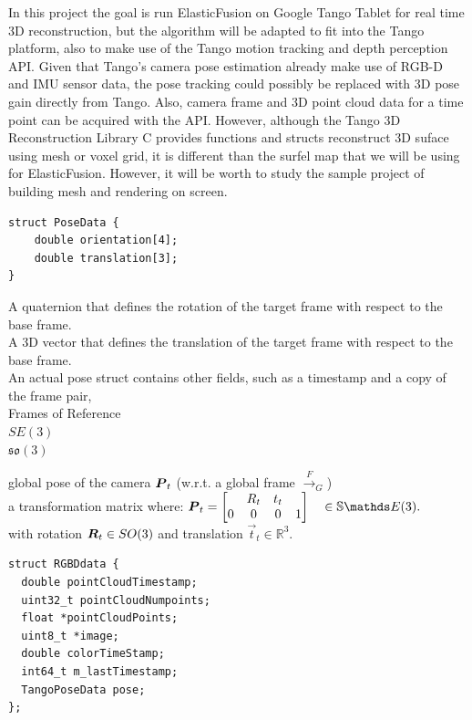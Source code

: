 \documentclass[12pt,twoside]{article}
\begin{document}
In this project the goal is run ElasticFusion\citep{whelan2016elasticfusion} on Google Tango Tablet for real time 3D reconstruction, but the algorithm will be adapted to fit into the Tango platform, also to make use of the Tango motion tracking and depth perception API. Given that Tango's camera pose estimation already make use of RGB-D and IMU sensor data, the pose tracking could possibly be replaced with 3D pose gain directly from Tango. Also, camera frame and 3D point cloud data for a time point can be acquired with the API. However, although the Tango 3D Reconstruction Library C provides functions and structs reconstruct 3D suface using mesh or voxel grid, it is different than the surfel map that we will be using for ElasticFusion\citep{whelan2016elasticfusion}. However, it will be worth to study the sample project of building mesh and rendering on screen.\\

\begin{lstlisting}
struct PoseData {
    double orientation[4];
    double translation[3];
}
\end{lstlisting}

A quaternion that defines the rotation of the target frame with respect to the base frame.\\
A 3D vector that defines the translation of the target frame with respect to the base frame.\\
An actual pose struct contains other fields, such as a timestamp and a copy of the frame pair, \\

Frames of Reference\\

 $ SE(3)$\\
$\mathfrak{so}(3)$

global pose of the camera ${\boldsymbol{{P}}}_t$ (w.r.t. a global frame $\xrightarrow{F}_G$) \\ 

a transformation matrix where: $\mat P_t = \begin{bmatrix}
& R_t & t_t\\
0 & 0 & 0 & 1
\end{bmatrix} \quad  \in \mathbb{S}\E(3). $ \\
with rotation ${\boldsymbol{{R}}}_t \in SO(3)$ and translation $\vec t_t \in \mathbb{R}^3$.


\begin{lstlisting}
struct RGBDdata {
  double pointCloudTimestamp;
  uint32_t pointCloudNumpoints;
  float *pointCloudPoints;
  uint8_t *image;
  double colorTimeStamp;
  int64_t m_lastTimestamp;
  TangoPoseData pose;
};
\end{lstlisting}
\end{document}

